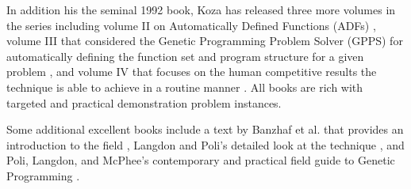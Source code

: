 In addition his the seminal 1992 book, Koza has released three more volumes in the series including volume II on Automatically Defined Functions (ADFs) \cite{Koza1994}, volume III that considered the Genetic Programming Problem Solver (GPPS) for automatically defining the function set and program structure for a given problem \cite{Koza1999}, and volume IV that focuses on the human competitive results the technique is able to achieve in a routine manner \cite{Koza2003}. All books are rich with targeted and practical demonstration problem instances.

Some additional excellent books include a text by Banzhaf et al. that provides an introduction to the field \cite{Banzhaf1998}, Langdon and Poli's detailed look at the technique \cite{Langdon2002}, and Poli, Langdon, and McPhee's contemporary and practical field guide to Genetic Programming \cite{Poli2008}.


